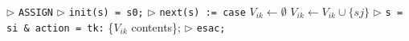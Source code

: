 \documentclass[a4paper,11pt]{article}
\begin{document}
\begin{algorithm}
	\begin{algorithmic}
		\State $\triangleright$ \verb!ASSIGN!
		\State $\triangleright$ \verb!init(s) = s0;!
		\State $\triangleright$ \verb!next(s) := case!
			\State $V_{ik} \gets \emptyset$
					\State $V_{ik} \gets V_{ik} \cup \{sj\}$
				\EndIf
			\EndFor
			\State $\triangleright$ \verb!s = si & action = tk:! \{$V_{ik}$ contents\};
			\EndFor
		\EndFor
		\State $\triangleright$ \verb!esac;!
	\end{algorithmic}
\end{algorithm}
\end{document}
